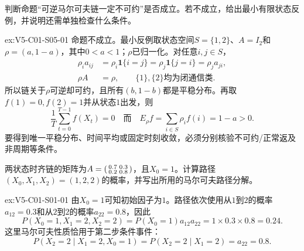 \begin{SLChapterExercisePairSection}
\begin{exercise}\label{ex:V5-C01-S05-01}
判断命题“可逆马尔可夫链一定不可约”是否成立。若不成立，给出最小有限状态反例，并说明还需单独检查什么条件。
\end{exercise}
\ifSLFullEdition
{}\label{sol:V5-C01-S05-01}
\begin{chapterexercisesolution}{ex:V5-C01-S05-01}
命题不成立。最小反例取状态空间$S=\{1,2\}$、$A=I_2$和$\rho=(a,1-a)$，其中$0<a<1$；$\rho$已归一化。对任意$i,j\in S$，
\[
\begin{aligned}
\rho_i a_{ij}&=\rho_i\boldsymbol1\{i=j\}
=\rho_j\boldsymbol1\{j=i\}=\rho_j a_{ji},\\
\rho A&=\rho,\qquad
\{1\},\{2\}\text{均为闭通信类}.
\end{aligned}
\]
所以链关于$\rho$可逆却可约，且所有$(b,1-b)$都是平稳分布。再取$f(1)=0,f(2)=1$并从状态$1$出发，则
\[
\frac1T\sum_{t=0}^{T-1}f(X_t)=0
\quad\text{而}\quad
E_\rho f=\sum_{i\in S}\rho_i f(i)=1-a>0.
\]
要得到唯一平稳分布、时间平均或固定时刻收敛，必须分别核验不可约/正常返及非周期等条件。
\end{chapterexercisesolution}
\fi

\SLLectureSupplementExercises

\begin{exercise}\label{ex:V5-C01-S01-01}
两状态时齐链的矩阵为$A=\begin{psmallmatrix}0.7&0.3\\0.2&0.8\end{psmallmatrix}$，且$X_0=1$。计算路径$(X_0,X_1,X_2)=(1,2,2)$的概率，并写出所用的马尔可夫路径分解。
\end{exercise}
\ifSLFullEdition
{}\label{sol:V5-C01-S01-01}
\begin{chapterexercisesolution}{ex:V5-C01-S01-01}
\nopagebreak[4]
由$X_0=1$可知初始因子为$1$。路径依次使用从$1$到$2$的概率$a_{12}=0.3$和从$2$到$2$的概率$a_{22}=0.8$，因此
\[
P(X_0=1,X_1=2,X_2=2)
=P(X_0=1)a_{12}a_{22}=1\times0.3\times0.8=0.24.
\]
这里马尔可夫性质恰用于第二步条件事件：
\[
P(X_2=2\mid X_1=2,X_0=1)
=P(X_2=2\mid X_1=2)=a_{22}=0.8.
\]
\end{chapterexercisesolution}
\fi


\end{SLChapterExercisePairSection}
